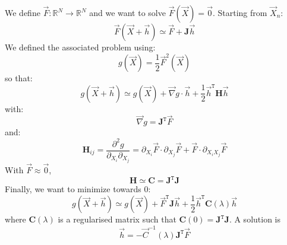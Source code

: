 \documentclass[aps,12pt]{revtex4}
\newcommand{\trn}[1]{{#1}^{\mathtt{T}}}
\begin{document}
We define $\vec{F} : \mathbb{R}^N \rightarrow \mathbb{R}^N$ and we want to solve $\vec{F}(\vec{X})=\vec{0}$.
Starting from $\vec{X}_n$:
\begin{equation}
	\vec{F}(\vec{X} + \vec{h}) \simeq \vec{F} + \bm{J} \vec{h}
\end{equation}
We defined the associated problem using:
\begin{equation}
	g(\vec{X}) = \frac{1}{2} \vec{F}^2(\vec{X}) 
\end{equation}
so that:
\begin{equation}
	g(\vec{X}+\vec{h}) \simeq g(\vec{X}) + \vec{\nabla}g \cdot \vec{h} + \frac{1}{2} \trn{\vec{h}} \bm{H} \vec{h}
\end{equation}
with:
\begin{equation}
	\vec{\nabla}g =  \trn{\bm{J}} \vec{F}
\end{equation}
and:
\begin{equation}
	\bm{H}_{ij} = \dfrac{\partial^2 g}{\partial_{X_i}\partial_{X_j}} = \partial_{X_i} \vec{F} \cdot \partial_{X_j} \vec{F} + \vec{F} \cdot \partial_{X_iX_j} \vec{F}
\end{equation}
With $\vec{F}\approx\vec0$,
\begin{equation}
	\bm{H} \simeq \bm{C}  = \trn{\bm{J}} \bm{J}
\end{equation}
Finally, we want to minimize towards $0$:
\begin{equation}
	g(\vec{X} +\vec{h}) \simeq g(\vec{X}) + \trn{\vec{F}} \bm{J}  \vec{h} + \frac{1}{2} \trn{\vec{h}} \bm{C} (\lambda) \vec{h}
\end{equation}
where $\bm{C}(\lambda)$ is a regularised matrix such that $\bm{C}(0)=\trn{\bm{J}}\bm{J}$.
A solution is
\begin{equation}
	\vec{h} = -\vec{C}^{-1}(\lambda) \trn{\bm{J}} \vec{F}
\end{equation}
\end{document}
